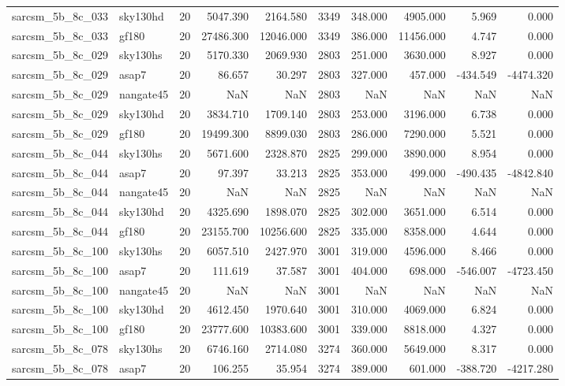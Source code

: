 \documentclass{article}
\begin{document}
\begin{longtable}{llrrrrrrrr}
sarcsm\_5b\_8c\_033 & sky130hd & 20 & 5047.390 & 2164.580 & 3349 & 348.000 & 4905.000 & 5.969 & 0.000 \\
sarcsm\_5b\_8c\_033 & gf180 & 20 & 27486.300 & 12046.000 & 3349 & 386.000 & 11456.000 & 4.747 & 0.000 \\
sarcsm\_5b\_8c\_029 & sky130hs & 20 & 5170.330 & 2069.930 & 2803 & 251.000 & 3630.000 & 8.927 & 0.000 \\
sarcsm\_5b\_8c\_029 & asap7 & 20 & 86.657 & 30.297 & 2803 & 327.000 & 457.000 & -434.549 & -4474.320 \\
sarcsm\_5b\_8c\_029 & nangate45 & 20 & NaN & NaN & 2803 & NaN & NaN & NaN & NaN \\
sarcsm\_5b\_8c\_029 & sky130hd & 20 & 3834.710 & 1709.140 & 2803 & 253.000 & 3196.000 & 6.738 & 0.000 \\
sarcsm\_5b\_8c\_029 & gf180 & 20 & 19499.300 & 8899.030 & 2803 & 286.000 & 7290.000 & 5.521 & 0.000 \\
sarcsm\_5b\_8c\_044 & sky130hs & 20 & 5671.600 & 2328.870 & 2825 & 299.000 & 3890.000 & 8.954 & 0.000 \\
sarcsm\_5b\_8c\_044 & asap7 & 20 & 97.397 & 33.213 & 2825 & 353.000 & 499.000 & -490.435 & -4842.840 \\
sarcsm\_5b\_8c\_044 & nangate45 & 20 & NaN & NaN & 2825 & NaN & NaN & NaN & NaN \\
sarcsm\_5b\_8c\_044 & sky130hd & 20 & 4325.690 & 1898.070 & 2825 & 302.000 & 3651.000 & 6.514 & 0.000 \\
sarcsm\_5b\_8c\_044 & gf180 & 20 & 23155.700 & 10256.600 & 2825 & 335.000 & 8358.000 & 4.644 & 0.000 \\
sarcsm\_5b\_8c\_100 & sky130hs & 20 & 6057.510 & 2427.970 & 3001 & 319.000 & 4596.000 & 8.466 & 0.000 \\
sarcsm\_5b\_8c\_100 & asap7 & 20 & 111.619 & 37.587 & 3001 & 404.000 & 698.000 & -546.007 & -4723.450 \\
sarcsm\_5b\_8c\_100 & nangate45 & 20 & NaN & NaN & 3001 & NaN & NaN & NaN & NaN \\
sarcsm\_5b\_8c\_100 & sky130hd & 20 & 4612.450 & 1970.640 & 3001 & 310.000 & 4069.000 & 6.824 & 0.000 \\
sarcsm\_5b\_8c\_100 & gf180 & 20 & 23777.600 & 10383.600 & 3001 & 339.000 & 8818.000 & 4.327 & 0.000 \\
sarcsm\_5b\_8c\_078 & sky130hs & 20 & 6746.160 & 2714.080 & 3274 & 360.000 & 5649.000 & 8.317 & 0.000 \\
sarcsm\_5b\_8c\_078 & asap7 & 20 & 106.255 & 35.954 & 3274 & 389.000 & 601.000 & -388.720 & -4217.280 \\

\end{longtable}
\end{document}
